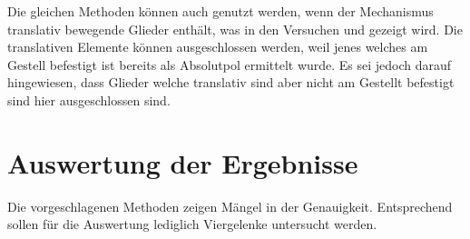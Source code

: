 Die gleichen Methoden können auch genutzt werden, wenn der Mechanismus translativ bewegende Glieder enthält, was in den Versuchen  und  gezeigt wird.
Die translativen Elemente können ausgeschlossen werden, weil jenes welches am Gestell befestigt ist bereits als Absolutpol ermittelt wurde.
Es sei jedoch darauf hingewiesen, dass Glieder welche translativ sind aber nicht am Gestellt befestigt sind hier ausgeschlossen sind.

\section{Auswertung der Ergebnisse}

Die vorgeschlagenen Methoden zeigen Mängel in der Genauigkeit.
Entsprechend sollen für die Auswertung lediglich Viergelenke untersucht werden.

